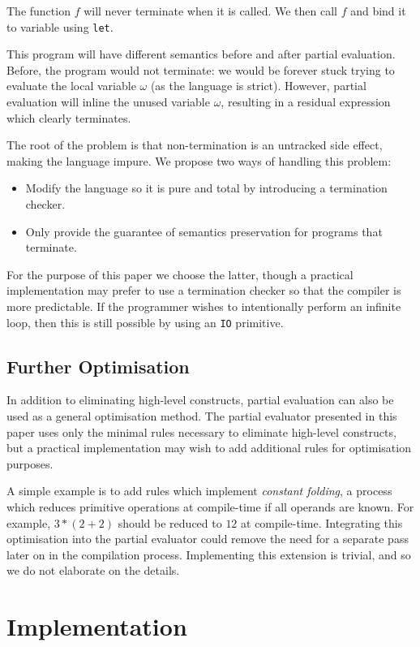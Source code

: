 \documentclass[runningheads]{llncs}
\begin{document}
The function $f$ will never terminate when it is called. We then call $f$ and bind it to variable using \texttt{let}.

This program will have different semantics before and after partial evaluation. Before, the program would not terminate: we would be forever stuck trying to evaluate the local variable $\omega$ (as the language is strict). However, partial evaluation will inline the unused variable $\omega$, resulting in a residual expression which clearly terminates.

The root of the problem is that non-termination is an untracked side effect, making the language impure. We propose two ways of handling this problem:

\begin{itemize}
  \item Modify the language so it is pure and total by introducing a termination checker.
  \item Only provide the guarantee of semantics preservation for programs that terminate.
\end{itemize}

For the purpose of this paper we choose the latter, though a practical implementation may prefer to use a termination checker so that the compiler is more predictable. If the programmer wishes to intentionally perform an infinite loop, then this is still possible by using an \texttt{IO} primitive.

\subsection{Further Optimisation}

In addition to eliminating high-level constructs, partial evaluation can also be used as a general optimisation method. The partial evaluator presented in this paper uses only the minimal rules necessary to eliminate high-level constructs, but a practical implementation may wish to add additional rules for optimisation purposes.

A simple example is to add rules which implement \emph{constant folding}, a process which reduces primitive operations at compile-time if all operands are known. For example, $3 * (2 + 2)$ should be reduced to $12$ at compile-time. Integrating this optimisation into the partial evaluator could remove the need for a separate pass later on in the compilation process. Implementing this extension is trivial, and so we do not elaborate on the details.


\section{Implementation}
\end{document}

